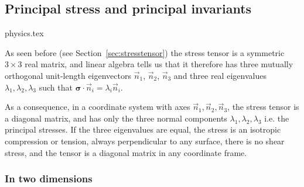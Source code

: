 

\subsection{Principal stress and principal invariants} \label{sec:princ_stress}
\begin{flushright} {\tiny {\color{gray} physics.tex}} \end{flushright}


As seen before (see Section~\ref{sec:stresstensor}) 
the stress tensor is a symmetric $3\times3$ real matrix, and linear algebra tells us that it 
therefore has three mutually orthogonal unit-length eigenvectors $\vec{n}_{1}$, $\vec{n}_{2}$, 
$\vec{n}_{3}$ and three real eigenvalues $\lambda _{1},\lambda _{2},\lambda _{3}$ 
such that ${\bm \sigma}\!\cdot\! \vec{n}_i=\lambda_{i} \vec{n}_{i}$.

As a consequence, in a coordinate system with axes $\vec{n}_{1},\vec{n}_{2},\vec{n}_{3}$, 
the stress tensor is a diagonal matrix, and has only the three normal components $\lambda _{1},\lambda _{2},\lambda _{3}$
i.e. the principal stresses. If the three eigenvalues are equal, the stress is an isotropic compression or tension, always perpendicular to any surface, there is no shear stress, and the tensor is a diagonal matrix in any coordinate frame.

\subsubsection{In two dimensions}

